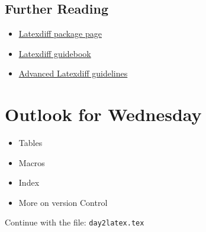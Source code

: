 \documentclass[a4paper,10pt]{report} %
\begin{document}
\subsection{Further Reading}
\begin{itemize}
 \item \href{https://www.ctan.org/pkg/latexdiff}{Latexdiff package page}
 \item \href{https://texdoc.org/serve/latexdiff/0}{Latexdiff guidebook}
 \item \href{https://texra.ai/guide/latex-diff.html}{Advanced Latexdiff guidelines}
\end{itemize}



\section{Outlook for Wednesday}\label{sec:wednesday}

\begin{itemize}
 \item Tables
 \item Macros
 \item Index
 \item More on version Control
\end{itemize}

Continue with the file: \texttt{day2latex.tex}



 
\label{LastPage}
\newpage
\end{document}
